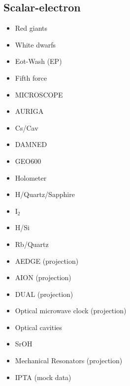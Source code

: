\documentclass[9pt,twocolumn]{extarticle}
\begin{document}
\begin{mdframed}
\subsection*{Scalar-electron}\vspace{-0.5em}
\begin{itemize}\setlength\itemsep{-0.5em}
	\item Red giants~\cite{Hardy:2016kme}
	\item White dwarfs~\cite{Bottaro:2023gep}
	\item Eot-Wash (EP)~\cite{Hees:2018fpg}
	\item Fifth force~\cite{Arvanitaki:2015iga}
	\item MICROSCOPE~\cite{Berge:2017ovy}
		\item AURIGA~\cite{Branca:2016rez}
	\item Cs/Cav~\cite{Tretiak:2022ndx}
	\item DAMNED~\cite{Savalle:2020vgz}
	\item GEO600~\cite{Vermeulen:2021epa}
	\item Holometer~\cite{Aiello:2021wlp}
	\item H/Quartz/Sapphire~\cite{Campbell:2020fvq}
	\item I$_2$~\cite{Oswald:2021vtc}
	\item H/Si~\cite{Kennedy:2020bac}
	\item Rb/Quartz~\cite{Zhang:2022ewz}
	\item AEDGE (projection)~\cite{Badurina:2021rgt}
	\item AION (projection)~\cite{Badurina:2021rgt}
	\item DUAL (projection)~\cite{Arvanitaki:2015iga}
		\item Optical microwave clock (projection)~\cite{Arvanitaki:2015iga}
\item Optical cavities~\cite{Geraci:2018fax}
\item SrOH~\cite{SrOH}
		\item Mechanical Resonators (projection)~\cite{Manley:2019vxy}
			\item IPTA (mock data)~\cite{Kaplan:2022lmz}

\end{itemize}
\end{mdframed}
\end{document}
